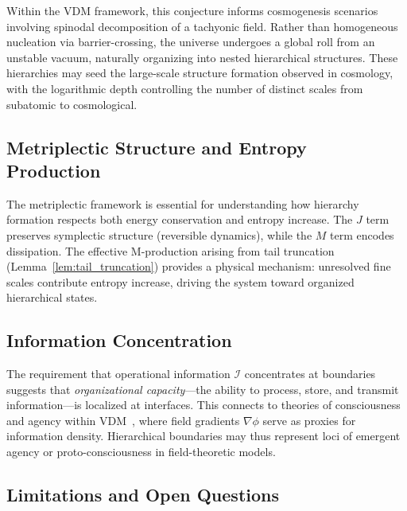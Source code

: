 \documentclass{article}
\begin{document}
Within the VDM framework, this conjecture informs cosmogenesis scenarios involving spinodal decomposition of a tachyonic field. Rather than homogeneous nucleation via barrier-crossing, the universe undergoes a global roll from an unstable vacuum, naturally organizing into nested hierarchical structures. These hierarchies may seed the large-scale structure formation observed in cosmology, with the logarithmic depth controlling the number of distinct scales from subatomic to cosmological.

\subsection*{Metriplectic Structure and Entropy Production}

The metriplectic framework is essential for understanding how hierarchy formation respects both energy conservation and entropy increase. The $J$ term preserves symplectic structure (reversible dynamics), while the $M$ term encodes dissipation. The effective M-production arising from tail truncation (Lemma~\ref{lem:tail_truncation}) provides a physical mechanism: unresolved fine scales contribute entropy increase, driving the system toward organized hierarchical states.

\subsection*{Information Concentration}

The requirement that operational information $\mathcal{I}$ concentrates at boundaries suggests that \emph{organizational capacity}---the ability to process, store, and transmit information---is localized at interfaces. This connects to theories of consciousness and agency within VDM~\cite{vdm_agency_field}, where field gradients $\nabla\phi$ serve as proxies for information density. Hierarchical boundaries may thus represent loci of emergent agency or proto-consciousness in field-theoretic models.

\subsection*{Limitations and Open Questions}
\end{document}
